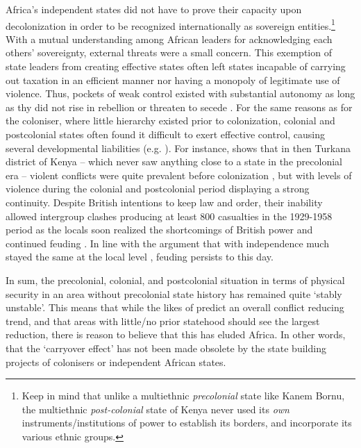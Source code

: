 Africa's independent states did not have to prove their capacity upon
decolonization in order to be recognized internationally as sovereign
entities.\footnote{Keep in mind that unlike a multiethnic \textit{precolonial}
	state like Kanem Bornu, the multiethnic \textit{post-colonial} state of
Kenya never used its \textit{own} instruments/institutions of power to establish
its borders, and incorporate its various ethnic groups.} With a mutual
understanding among African leaders for acknowledging each others' sovereignty,
external threats were a small concern. This exemption of state leaders from
creating effective states \citep{Jackson_1982} often left states incapable of
carrying out taxation in an efficient manner nor having a monopoly of legitimate
use of violence. Thus, pockets of weak control existed with substantial autonomy
as long as thy did not rise in rebellion or threaten to secede
\citep[47]{englebert2013inside}. For the same reasons as for the coloniser,
where little hierarchy existed prior to colonization, colonial and postcolonial
states often found it difficult to exert effective control, causing several
developmental liabilities (e.g. \citet{Michalopoulos2013}). For instance,
\citet[8ff]{oba1992ecological} shows that in then Turkana district of Kenya --
which never saw anything close to a state in the precolonial era -- violent
conflicts were quite prevalent before colonization
\citep{muller1989transforming}, but with levels of violence during the colonial
and postcolonial period displaying a strong continuity. Despite British
intentions to keep law and order, their inability allowed intergroup clashes
producing at least 800 casualties in the 1929-1958 period as the locals soon
realized the shortcomings of British power and continued feuding
\citep[8]{oba1992ecological}. In line with the argument that with independence
much stayed the same at the local level \citep{englebert2013inside}, feuding
persists to this day. 


In sum, the precolonial, colonial, and postcolonial situation in terms of
physical security in an area without precolonial state history has remained
quite `stably unstable'. This means that while the likes of \citet{Pinker2012}
predict an overall conflict reducing trend, and that areas with little/no prior
statehood should see the largest reduction, there is reason to believe that this
has eluded Africa. In other words, that the `carryover effect' has not been made
obsolete by the state building projects of colonisers or independent African
states.

